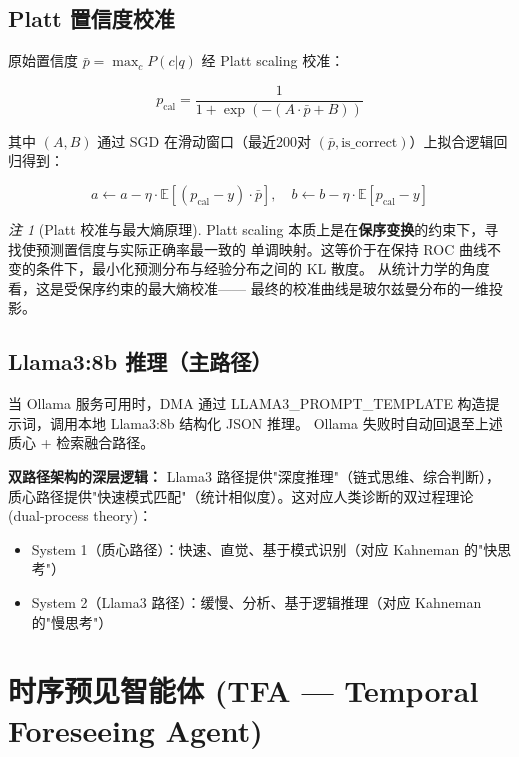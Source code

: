 \documentclass[11pt,a4paper]{ctexart}
\theoremstyle{remark}
\newtheorem{remark}{注}[section]
\begin{document}
\subsection{Platt 置信度校准}

原始置信度 $\bar{p} = \max_c P(c|q)$ 经 Platt scaling 校准：

\begin{equation}
p_{\text{cal}} = \frac{1}{1 + \exp(-(A \cdot \bar{p} + B))}
\end{equation}

其中 $(A, B)$ 通过 SGD 在滑动窗口（最近200对 $(\bar{p}, \text{is\_correct})$）上拟合逻辑回归得到：

\begin{equation}
a \leftarrow a - \eta \cdot \mathbb{E}[(p_{\text{cal}} - y) \cdot \bar{p}], \quad b \leftarrow b - \eta \cdot \mathbb{E}[p_{\text{cal}} - y]
\end{equation}

\begin{remark}[Platt 校准与最大熵原理]
Platt scaling 本质上是在\textbf{保序变换}的约束下，寻找使预测置信度与实际正确率最一致的
单调映射。这等价于在保持 ROC 曲线不变的条件下，最小化预测分布与经验分布之间的 KL 散度。
从统计力学的角度看，这是受保序约束的最大熵校准——
最终的校准曲线是玻尔兹曼分布的一维投影。
\end{remark}

\subsection{Llama3:8b 推理（主路径）}

当 Ollama 服务可用时，DMA 通过 LLAMA3\_PROMPT\_TEMPLATE 构造提示词，调用本地 Llama3:8b 结构化 JSON 推理。
Ollama 失败时自动回退至上述质心 + 检索融合路径。

\textbf{双路径架构的深层逻辑：} Llama3 路径提供"深度推理"（链式思维、综合判断），
质心路径提供"快速模式匹配"（统计相似度）。这对应人类诊断的双过程理论 (dual-process theory)：
\begin{itemize}[nosep]
\item System 1（质心路径）：快速、直觉、基于模式识别（对应 Kahneman 的"快思考"）
\item System 2（Llama3 路径）：缓慢、分析、基于逻辑推理（对应 Kahneman 的"慢思考"）
\end{itemize}

\section{时序预见智能体 (TFA — Temporal Foreseeing Agent)}
\end{document}
